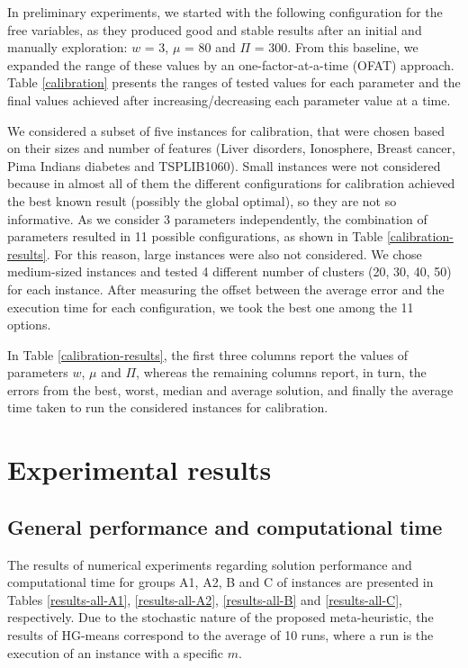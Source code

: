 In preliminary experiments, we started with the following configuration for the free variables, as they produced good and stable results after an initial and manually exploration: $w$ = 3, $\mu$ = 80 and $\Pi$ = 300. From this baseline, we expanded the range of these values by an one-factor-at-a-time (OFAT) approach. Table \ref{calibration} presents the ranges of tested values for each parameter and the final values achieved after increasing/decreasing each parameter value at a time.



We considered a subset of five instances for calibration, that were chosen based on their sizes and number of features (Liver disorders, Ionosphere, Breast cancer, Pima Indians diabetes and TSPLIB1060). Small instances were not considered because in almost all of them the different configurations for calibration achieved the best known result (possibly the global optimal), so they are not so informative. As we consider 3 parameters independently, the combination of parameters resulted in 11 possible configurations, as shown in Table \ref{calibration-results}. For this reason, large instances were also not considered.
We chose medium-sized instances and tested 4 different number of clusters (20, 30, 40, 50) for each instance. After measuring the offset between the average error and the execution time for each configuration, we took the best one among the 11 options.

In Table \ref{calibration-results}, the first three columns report the values of parameters $w$, $\mu$ and $\Pi$, whereas the remaining columns report, in turn, the errors from the best, worst, median and average solution, and finally the average time taken to run the considered instances for calibration.



\section{Experimental results}
\label{sec:results}

\subsection{General performance and computational time}
\label{sec:performance}
The results of numerical experiments regarding solution performance and computational time for groups A1, A2, B and C of instances are presented in Tables \ref{results-all-A1}, \ref{results-all-A2}, \ref{results-all-B} and \ref{results-all-C}, respectively. Due to the stochastic nature of the proposed meta-heuristic, the results of HG-means correspond to the average of 10 runs, where a run is the execution of an instance with a specific $m$. 

